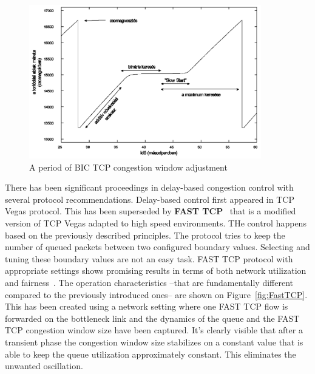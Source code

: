 \documentclass[a4paper]{article}
\begin{document}
\begin{figure}[H]
    \centering
    \includegraphics[width=0.9\textwidth]{figures/BICTCP.png}
    \caption{A period of BIC TCP congestion window adjustment}
    \label{fig:bictcp}
\end{figure}

There has been significant proceedings in delay-based congestion control with several protocol recommendations.
Delay-based control first appeared in TCP Vegas protocol. This has been superseded by \textbf{FAST TCP}~\cite{FastTCP}
that is a modified version of TCP Vegas adapted to high speed environments. THe control happens based on the previously
described principles. The protocol tries to keep the number of queued packets between two configured boundary values.
Selecting and tuning these boundary values are not an easy task. FAST TCP protocol with appropriate settings shows
promising results in terms of both network utilization and fairness~\cite{TCPFairnessAnalysis}. The operation
characteristics --that are fundamentally different compared to the previously introduced ones-- are shown on
Figure~\ref{fig:FastTCP}. This has been created using a network setting where one FAST TCP flow is forwarded on the
bottleneck link and the dynamics of the queue and the FAST TCP congestion window size have been captured. It's clearly
visible that after a transient phase the congestion window size stabilizes on a constant value that is able to keep
the queue utilization approximately constant. This eliminates the unwanted oscillation.
\end{document}
